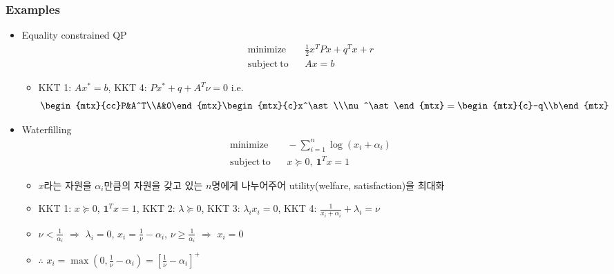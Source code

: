 \subsubsection*{Examples}
\begin{itemize}
    \item Equality constrained QP
    \begin{equation}\begin{aligned}
        \mathrm{minimize}~~&~~\frac{1}{2}x^TPx + q^Tx + r \\
        \mathrm{subject~to}~~&~~Ax = b
    \end{aligned}\end{equation}
    \begin{itemize}
        \item KKT 1: $Ax^\ast = b$, KKT 4: $Px^\ast + q + A^T\nu = 0$ i.e.
        \begin{equation}
            \begin{mtx}{cc}P&A^T\\A&0\end{mtx}\begin{mtx}{c}x^\ast\\\nu^\ast\end{mtx}=\begin{mtx}{c}-q\\b\end{mtx}
        \end{equation}
    \end{itemize}
    \item Waterfilling
    \begin{equation}\begin{aligned}
        \mathrm{minimize}~~&~~-\sum_{i=1}^n \log(x_i + \alpha_i) \\
        \mathrm{subject~to}~~&~~x\succeq 0,~\mathbf{1}^Tx = 1
    \end{aligned}\end{equation}
    \begin{itemize}
        \item $x$라는 자원을 $\alpha_i$만큼의 자원을 갖고 있는 $n$명에게 나누어주어 utility(welfare, satisfaction)을 최대화
        \item KKT 1: $x\succeq 0$, $\mathbf{1}^Tx = 1$, KKT 2: $\lambda\succeq 0$, KKT 3: $\lambda_i x_i = 0$, KKT 4: $\frac{1}{x_i+\alpha_i}+\lambda_i=\nu$
        \item $\nu<\frac{1}{\alpha_i}$ $\Rightarrow$ $\lambda_i=0$, $x_i = \frac{1}{\nu}-\alpha_i$, $\nu\geq\frac{1}{\alpha_i}$ $\Rightarrow$ $x_i = 0$
        \item $\therefore$ $x_i = \max(0, \frac{1}{\nu}-\alpha_i) = \left[\frac{1}{\nu}-\alpha_i\right]^+$
    \end{itemize}
    \begin{figures}
    \end{figures}
\end{itemize}

